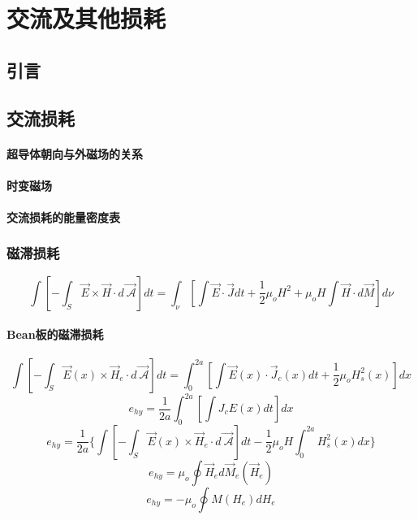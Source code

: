 \chapter{交流及其他损耗}
\section{引言}

\section{交流损耗}
\subsubsection*{超导体朝向与外磁场的关系}

\subsubsection*{时变磁场}

\subsubsection*{交流损耗的能量密度表}

\subsection{磁滞损耗}

\begin{equation}%
\int\left[-\int_{S}^{}\vec{E}\times\vec{H}\cdot d\vec{\ \mathcal{A}}\right]dt=\int_{\nu}^{}\left[\int\vec{E}\cdot\vec{J}dt+\frac{1}{2}\mu_oH^2+\mu_oH\int\vec{H}\cdot d\vec{M}\right]d\nu
\end{equation}

\subsubsection*{Bean板的磁滞损耗}
\begin{equation}%
\int\left[-\int_{S}\vec{E}(x)\times\vec{H}_e\cdot d\vec{\ \mathcal{A}}\right]dt=\int_{0}^{2a}\left[\int\vec{E}(x)\cdot\vec{J}_c(x)dt+\frac{1}{2}\mu_oH_{s}^{2}(x)\right]dx
\end{equation}
\begin{equation}%
e_{hy}=\frac{1}{2a}\int_{0}^{2a}\left[\int J_cE(x)dt\right]dx
\end{equation}
\begin{equation}%
e_{hy}=\frac{1}{2a}\{\int\left[-\int_{S}\vec{E}(x)\times\vec{H}_e\cdot d\vec{\ \mathcal{A}}\right]dt-\frac{1}{2}\mu_oH\int_{0}^{2a}H_{s}^{2}(x)dx\}
\end{equation}
\begin{equation}%
e_{hy}=\mu_o\oint\vec{H}_ed\vec{M}_e(\vec{H}_e)
\end{equation}
\begin{equation}%
e_{hy}=-\mu_o\oint M(H_e)dH_e
\end{equation}


